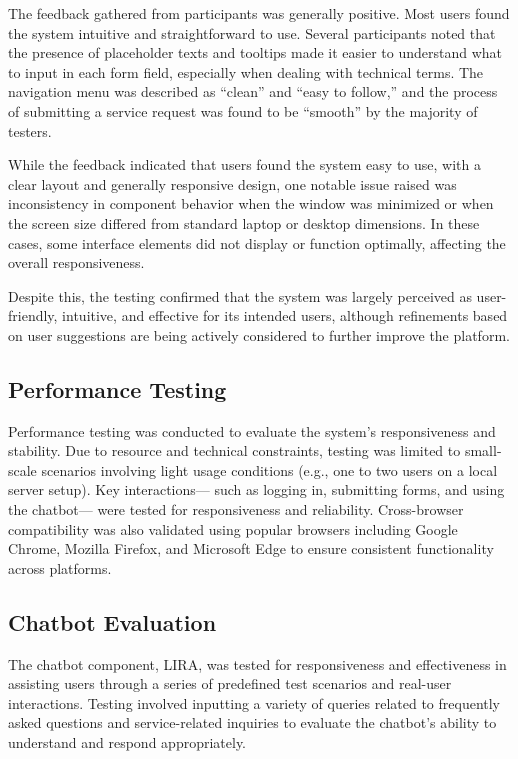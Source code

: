 The feedback gathered from participants was generally positive. Most users found the system intuitive and straightforward to use. Several participants noted that the presence of placeholder texts and tooltips made it easier to understand what to input in each form field, especially when dealing with technical terms. The navigation menu was described as “clean” and “easy to follow,” and the process of submitting a service request was found to be “smooth” by the majority of testers.

While the feedback indicated that users found the system easy to use, with a clear layout and generally responsive design, one notable issue raised was inconsistency in component behavior when the window was minimized or when the screen size differed from standard laptop or desktop dimensions. In these cases, some interface elements did not display or function optimally, affecting the overall responsiveness.

Despite this, the testing confirmed that the system was largely perceived as user-friendly, intuitive, and effective for its intended users, although refinements based on user suggestions are being actively considered to further improve the platform.

\subsection{Performance Testing}

Performance testing was conducted to evaluate the system's responsiveness and stability. Due to resource and technical constraints, testing was limited to small-scale scenarios involving light usage conditions (e.g., one to two users on a local server setup). Key interactions— such as logging in, submitting forms, and using the chatbot— were tested for responsiveness and reliability. Cross-browser compatibility was also validated using popular browsers including Google Chrome, Mozilla Firefox, and Microsoft Edge to ensure consistent functionality across platforms.

\subsection{Chatbot Evaluation}

The chatbot component, LIRA, was tested for responsiveness and effectiveness in assisting users through a series of predefined test scenarios and real-user interactions. Testing involved inputting a variety of queries related to frequently asked questions and service-related inquiries to evaluate the chatbot’s ability to understand and respond appropriately. 

